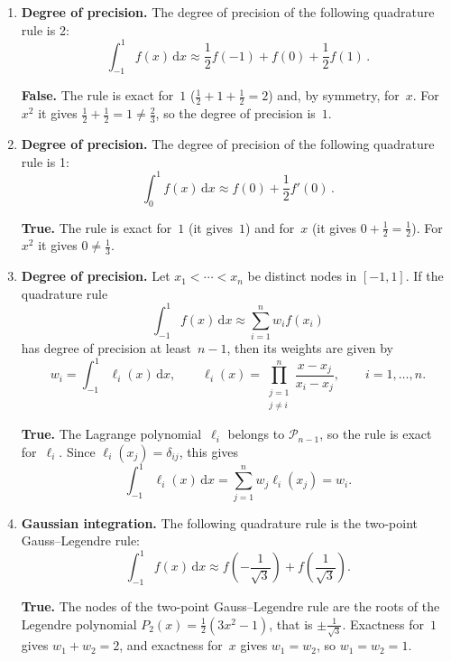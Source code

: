\documentclass[a4paper]{article}
\renewcommand{\d}{\mathrm d}
\newcommand{\answer}[1]{%
    \ifdefined\showsolutions
        \par\smallskip
        {\small\color{blue!60!black}#1\par}
    \fi
}
\begin{document}
\begin{enumerate}

    \item
        \textbf{Degree of precision.}
        The degree of precision of the following quadrature rule is 2:
        \[
            \int_{-1}^{1} f(x) \, \d x \approx \frac{1}{2} f(-1) + f(0) + \frac{1}{2} f(1)\,.
        \]
        \answer{\textbf{False.}
        The rule is exact for~$1$ ($\frac12 + 1 + \frac12 = 2$) and, by symmetry, for~$x$.
        For~$x^2$ it gives $\frac12 + \frac12 = 1 \neq \frac23$, so the degree of precision is~$1$.}

    \item
        \textbf{Degree of precision.}
        The degree of precision of the following quadrature rule is 1:
        \[
            \int_0^1 f(x) \, \d x \approx f(0) + \frac{1}{2} f'(0)\,.
        \]
        \answer{\textbf{True.}
        The rule is exact for~$1$ (it gives~$1$) and for~$x$ (it gives $0 + \frac12 = \frac12$).
        For~$x^2$ it gives $0 \neq \frac13$.}

    \item
        \textbf{Degree of precision.}
        Let $x_1 < \dotsb < x_n$ be distinct nodes in $[-1, 1]$.
        If the quadrature rule
        \[
            \int_{-1}^{1} f(x) \, \d x \approx \sum_{i=1}^{n} w_i f(x_i)
        \]
        has degree of precision at least~$n - 1$, then its weights are given by
        \[
            w_i = \int_{-1}^{1} \ell_i(x) \, \d x,
            \qquad
            \ell_i(x) = \prod_{\substack{j = 1 \\ j \neq i}}^{n} \frac{x - x_j}{x_i - x_j},
            \qquad i = 1, \dotsc, n.
        \]
        \answer{\textbf{True.}
        The Lagrange polynomial~$\ell_i$ belongs to $\mathcal P_{n-1}$, so the rule is exact for~$\ell_i$.
        Since $\ell_i(x_j) = \delta_{ij}$, this gives
        \[
            \int_{-1}^{1} \ell_i(x) \, \d x = \sum_{j=1}^{n} w_j \ell_i(x_j) = w_i.
        \]}

    \item
        \textbf{Gaussian integration.}
        The following quadrature rule is the two-point Gauss--Legendre rule:
        \begin{equation}
            \label{eq:gauss2}
            \int_{-1}^{1} f(x) \, \d x \approx f\left(-\frac{1}{\sqrt{3}}\right) + f\left(\frac{1}{\sqrt{3}}\right).
        \end{equation}
        \answer{\textbf{True.}
        The nodes of the two-point Gauss--Legendre rule are the roots of the Legendre polynomial $P_2(x) = \frac{1}{2} (3x^2 - 1)$,
        that is $\pm \frac{1}{\sqrt{3}}$.
        Exactness for~$1$ gives $w_1 + w_2 = 2$, and exactness for~$x$ gives $w_1 = w_2$, so $w_1 = w_2 = 1$.}


\end{enumerate}
\end{document}
